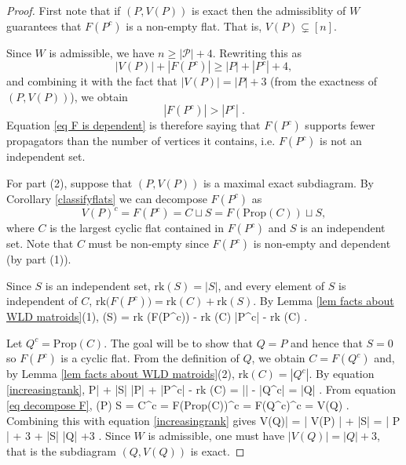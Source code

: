\documentclass[11pt]{article}
\newcommand{\rk}{\textrm{rk} }
\def\ba #1\ea{\begin{align} #1 \end{align}}
\def\bas #1\eas{\begin{align*} #1 \end{align*}}
\newcommand{\cP}{\mathcal{P}}
\newcommand{\Prop}{\textrm{Prop}}
\theoremstyle{remark}
\theoremstyle{definition}
\begin{document}
\begin{proof}

First note that if $(P,V(P))$ is exact then the admissiblity of $W$ guarantees that $F(P^c)$ is a non-empty flat. That is, $V(P) \subsetneq [n]$.

Since $W$ is admissible, we have $n \geq |\cP| + 4$. Rewriting this as
\[|V(P)| + |F(P^c)|  \geq  |P| + |P^c| +4,\]
and combining it with the fact that $|V(P)| = |P| + 3$ (from the exactness of $(P,V(P))$), we obtain
\begin{equation}\label{eq F is dependent}|F(P^c)| > |P^c| \;.\end{equation}
Equation \eqref{eq F is dependent} is therefore saying that $F(P^c)$ supports fewer propagators than the number of vertices it contains, i.e. $F(P^c)$ is not an independent set.

For part (2), suppose that $(P, V(P))$ is a maximal exact subdiagram. By Corollary \ref{classifyflats} we can decompose $F(P^c)$ as
\begin{equation}\label{eq decompose F}V(P)^c = F(P^c) = C \sqcup S = F(\Prop(C)) \sqcup S,\end{equation}
where $C$ is the largest cyclic flat contained in $F(P^c)$ and $S$ is an  independent set. Note that $C$ must be non-empty since $F(P^c)$ is non-empty and dependent (by part (1)).

Since $S$ is an independent set, $\rk(S) = |S|$, and every element of $S$ is independent of $C$, $\rk\big(F(P^c)\big) = \rk(C) + \rk(S)$. By Lemma \ref{lem facts about WLD matroids}(1), \ba \rk(S) = \rk\big(F(P^c)\big) -  \rk(C) \leq |P^c| - \rk(C) \;. \label{increasingrank} \ea

Let $Q^c = \Prop(C)$. The goal will be to show that $Q=P$ and hence that $S=0$ so $F(P^c)$ is a cyclic flat.  From the definition of $Q$, we obtain $C = F(Q^c)$ and, by Lemma \ref{lem facts about WLD matroids}(2), $\rk(C) = |Q^c|$. By equation \eqref{increasingrank}, \ba |P| + |S| \leq |P| + |P^c| - \rk(C) = |\cP| - |Q^c| = |Q| \;. \label{Qsizebound}\ea From equation \eqref{eq decompose F}, \bas V(P) \sqcup S = C^c = F(\Prop(C))^c = F(Q^c)^c = V(Q) \;. \eas Combining this with equation \eqref{increasingrank} gives \ba |V(Q)| = | V(P) | + |S| = | P | + 3 + |S| \leq |Q| +3 \;. \label{Q defines exact}\ea Since $W$ is admissible, one must have $|V(Q)| = |Q| +3$, that is the subdiagram $(Q, V(Q))$ is exact.


\end{proof}
\end{document}
